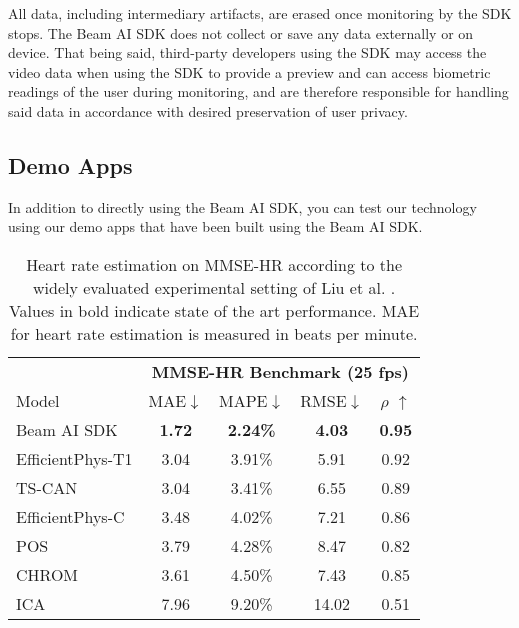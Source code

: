 \documentclass{article}
\begin{document}
All data, including intermediary artifacts, are erased once monitoring by the SDK stops. The Beam AI SDK does not collect or save any data externally or on device. That being said, third-party developers using the SDK may access the video data when using the SDK to provide a preview and can access biometric readings of the user during monitoring, and are therefore responsible for handling said data in accordance with desired preservation of user privacy. 

\subsection{Demo Apps} 

In addition to directly using the Beam AI SDK, you can test our technology using our demo apps that have been built using the Beam AI SDK.

\begin{table}[t]
    \centering
    \tabcolsep=0.67cm
    \begin{tabular}{lcccc}
        {} & \multicolumn{4}{c}{\textbf{MMSE-HR Benchmark (25 fps)}} \\
        Model & MAE$\downarrow$ & MAPE$\downarrow$ & RMSE$\downarrow$ & $\rho$ $\uparrow$ \\
        \midrule
        Beam AI SDK & \textbf{1.72} & \textbf{2.24\%} & \textbf{4.03} & \textbf{0.95} \\
        \midrule
        EfficientPhys-T1 \cite{EfficientPhys_Liu2021} & 3.04 & 3.91\% & 5.91 & 0.92 \\
        TS-CAN \cite{TSCAN_Liu2020} & 3.04 & 3.41\% & 6.55 & 0.89 \\
        EfficientPhys-C \cite{EfficientPhys_Liu2021} & 3.48 & 4.02\% & 7.21 & 0.86 \\
        POS \cite{POS_Wang2016} & 3.79 & 4.28\% & 8.47 & 0.82 \\
        CHROM \cite{CHROM_DeHaan2013} & 3.61 & 4.50\% & 7.43 & 0.85 \\
        ICA \cite{ICA_Poh2011} & 7.96 & 9.20\% & 14.02 & 0.51 \\
    \end{tabular}
    \vspace{0.05in}
    \caption{Heart rate estimation on MMSE-HR \cite{Zhang16_MMSE} according to the widely evaluated experimental setting of Liu et al. \cite{TSCAN_Liu2020, MetaPhys_Liu2021, EfficientPhys_Liu2021}. Values in bold indicate state of the art performance. MAE for heart rate estimation is measured in beats per minute.}
    \label{tab:liu-eval-mmse}
    \vspace{-0.2in}
\end{table}
\end{document}
